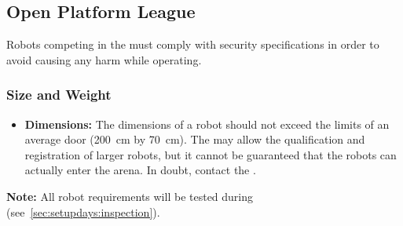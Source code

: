 \subsection{Open Platform League}
\label{sec:rules:robotappearance_opl}
Robots competing in the \OPL{} must comply with security specifications in order to avoid causing any harm while operating.

\subsubsection{Size and Weight}
\label{sec:rules:robotappearance_opl:size}

\begin{itemize}
	\item \textbf{Dimensions:} The dimensions of a robot should not exceed the limits of an average door (\SI{200}{\centi\meter} by \SI{70}{\centi\meter}). The \TC{} may allow the qualification and registration of larger robots, but it cannot be guaranteed that the robots can actually enter the arena. In doubt, contact the \LOC{}.
\end{itemize}


\noindent\textbf{Note:} All robot requirements will be tested during \RobotInspection{} (see~\ref{sec:setupdays:inspection}).